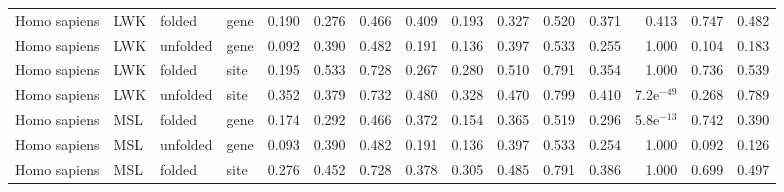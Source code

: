 \begin{longtable}{llllrrrrrrrrrrr}
        Homo sapiens &                       LWK &    folded &  gene &                              0.190 &                               0.276 &                 0.466 &                 0.409 &                              0.193 &                               0.327 &                 0.520 &                 0.371 &         0.413 &  0.747 &  0.482 \\
        Homo sapiens &                       LWK &  unfolded &  gene &                              0.092 &                               0.390 &                 0.482 &                 0.191 &                              0.136 &                               0.397 &                 0.533 &                 0.255 &         1.000 &  0.104 &  0.183 \\
        Homo sapiens &                       LWK &    folded &  site &                              0.195 &                               0.533 &                 0.728 &                 0.267 &                              0.280 &                               0.510 &                 0.791 &                 0.354 &         1.000 &  0.736 &  0.539 \\
        Homo sapiens &                       LWK &  unfolded &  site &                              0.352 &                               0.379 &                 0.732 &                 0.480 &                              0.328 &                               0.470 &                 0.799 &                 0.410 &  7.2e$^{-49}$ &  0.268 &  0.789 \\
        Homo sapiens &                       MSL &    folded &  gene &                              0.174 &                               0.292 &                 0.466 &                 0.372 &                              0.154 &                               0.365 &                 0.519 &                 0.296 &  5.8e$^{-13}$ &  0.742 &  0.390 \\
        Homo sapiens &                       MSL &  unfolded &  gene &                              0.093 &                               0.390 &                 0.482 &                 0.191 &                              0.136 &                               0.397 &                 0.533 &                 0.254 &         1.000 &  0.092 &  0.126 \\
        Homo sapiens &                       MSL &    folded &  site &                              0.276 &                               0.452 &                 0.728 &                 0.378 &                              0.305 &                               0.485 &                 0.791 &                 0.386 &         1.000 &  0.699 &  0.497 \\

\end{longtable}
